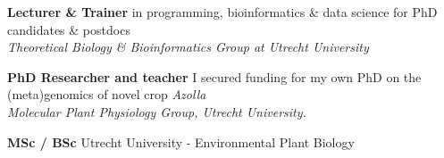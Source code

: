 \documentclass[a4paper,10pt]{article}
\begin{document}
{\begin{adjustbox}{valign=t}
\begin{minipage}[t]{0.3\textwidth}

\end{minipage}%
\end{adjustbox}%
\hfill%


\begin{adjustbox}{valign=t}
\hfill%
\begin{minipage}[t]{0.05\textwidth}
\MyVerticalRule
\end{minipage}%
\end{adjustbox}

\begin{adjustbox}{valign=t}
\hfill%
\begin{minipage}[t]{0.6\textwidth}


\begin{description}
\raggedright
\item[\normalfont \textcolor{ForestGreen}{\textbf{2022 -- now.}}] \textbf{Lecturer \&  Trainer} in programming, bioinformatics \& data science for PhD candidates \& postdocs \\
\textit{Theoretical Biology \& Bioinformatics Group at Utrecht University}
\item[\normalfont \textcolor{ForestGreen}{\textbf{2017 -- 2022.}}] \textbf{PhD Researcher and teacher} I secured funding for my own PhD on the (meta)genomics of novel crop \textit{Azolla} \\ 
\textit{Molecular Plant Physiology Group, Utrecht University.}
\end{description}

\begin{description}
  \raggedright
  \item[\normalfont \textcolor{ForestGreen}{\textbf{2010 -- 2017.}}] \textbf{MSc / BSc} Utrecht University - Environmental Plant Biology
\end{description}


\end{minipage}
\end{adjustbox}}
\end{document}
